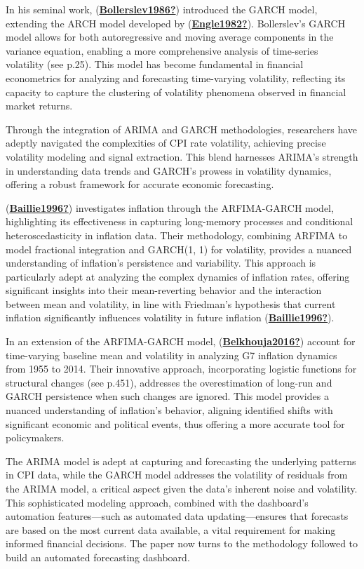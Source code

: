 \documentclass[11pt,preprint, authoryear]{elsarticle}
\numberwithin{equation}{section}
\numberwithin{figure}{section}
\numberwithin{table}{section}
\begin{document}
In his seminal work,
(\protect\hyperlink{ref-Bollerslev1986}{\textbf{Bollerslev1986?}})
introduced the GARCH model, extending the ARCH model developed by
(\protect\hyperlink{ref-Engle1982}{\textbf{Engle1982?}}). Bollerslev's
GARCH model allows for both autoregressive and moving average components
in the variance equation, enabling a more comprehensive analysis of
time-series volatility (see p.25). This model has become fundamental in
financial econometrics for analyzing and forecasting time-varying
volatility, reflecting its capacity to capture the clustering of
volatility phenomena observed in financial market returns.

Through the integration of ARIMA and GARCH methodologies, researchers
have adeptly navigated the complexities of CPI rate volatility,
achieving precise volatility modeling and signal extraction. This blend
harnesses ARIMA's strength in understanding data trends and GARCH's
prowess in volatility dynamics, offering a robust framework for accurate
economic forecasting.

(\protect\hyperlink{ref-Baillie1996}{\textbf{Baillie1996?}})
investigates inflation through the ARFIMA-GARCH model, highlighting its
effectiveness in capturing long-memory processes and conditional
heteroscedasticity in inflation data. Their methodology, combining
ARFIMA to model fractional integration and GARCH(1, 1) for volatility,
provides a nuanced understanding of inflation's persistence and
variability. This approach is particularly adept at analyzing the
complex dynamics of inflation rates, offering significant insights into
their mean-reverting behavior and the interaction between mean and
volatility, in line with Friedman's hypothesis that current inflation
significantly influences volatility in future inflation
(\protect\hyperlink{ref-Baillie1996}{\textbf{Baillie1996?}}).

In an extension of the ARFIMA-GARCH model,
(\protect\hyperlink{ref-Belkhouja2016}{\textbf{Belkhouja2016?}}) account
for time-varying baseline mean and volatility in analyzing G7 inflation
dynamics from 1955 to 2014. Their innovative approach, incorporating
logistic functions for structural changes (see p.451), addresses the
overestimation of long-run and GARCH persistence when such changes are
ignored. This model provides a nuanced understanding of inflation's
behavior, aligning identified shifts with significant economic and
political events, thus offering a more accurate tool for policymakers.

The ARIMA model is adept at capturing and forecasting the underlying
patterns in CPI data, while the GARCH model addresses the volatility of
residuals from the ARIMA model, a critical aspect given the data's
inherent noise and volatility. This sophisticated modeling approach,
combined with the dashboard's automation features---such as automated
data updating---ensures that forecasts are based on the most current
data available, a vital requirement for making informed financial
decisions. The paper now turns to the methodology followed to build an
automated forecasting dashboard.
\end{document}
